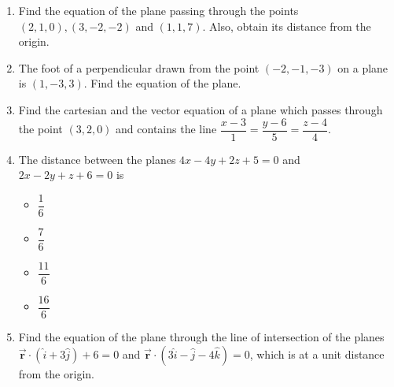 %
\begin{enumerate}
\item Find the equation of the plane passing through the points $(2,1,0),(3,-2,-2)$ and $(1,1,7)$. Also, obtain its distance from the origin.
\vspace{4mm}
\item The foot of a perpendicular drawn from the point $(-2,-1,-3)$ on a plane is $(1,-3,3)$. Find the equation of the plane.
\vspace{4mm}
\item Find the cartesian and the vector equation of a plane which passes through the point $(3,2,0)$ and contains the line $\dfrac{x-3}{1}=\dfrac{y-6}{5}=\dfrac{z-4}{4}$.
\vspace{4mm}
\item The distance between the planes $4x-4y+2z+5=0$ and $2x-2y+z+6=0$ is
	\begin{itemize}
		\vspace{2mm}
	\item $\dfrac{1}{6}$
	        \vspace{2mm}
	\item $\dfrac{7}{6}$
		\vspace{2mm}
	\item $\dfrac{11}{6}$
		\vspace{2mm}
	\item $\dfrac{16}{6}$
	\end{itemize}
		\vspace{4mm}
	\item Find the equation of the plane through the line of intersection of the planes $\overrightarrow{\textbf{r}}\cdot(\hat{i}+3\hat{j})+6=0$ and $\overrightarrow{\textbf{r}}\cdot(3\hat{i}-\hat{j}-4\hat{k})=0$, which is at a  unit distance from the origin.
\end{enumerate}
%
